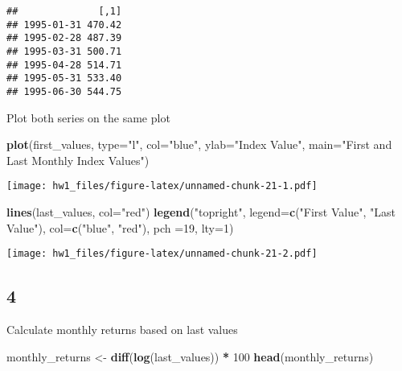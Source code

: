 \documentclass[
]{article}
\newenvironment{Shaded}{\begin{snugshade}}{\end{snugshade}}
\newcommand{\AttributeTok}[1]{\textcolor[rgb]{0.13,0.29,0.53}{#1}}
\newcommand{\DecValTok}[1]{\textcolor[rgb]{0.00,0.00,0.81}{#1}}
\newcommand{\FunctionTok}[1]{\textcolor[rgb]{0.13,0.29,0.53}{\textbf{#1}}}
\newcommand{\NormalTok}[1]{#1}
\newcommand{\OtherTok}[1]{\textcolor[rgb]{0.56,0.35,0.01}{#1}}
\newcommand{\SpecialCharTok}[1]{\textcolor[rgb]{0.81,0.36,0.00}{\textbf{#1}}}
\newcommand{\StringTok}[1]{\textcolor[rgb]{0.31,0.60,0.02}{#1}}
\begin{document}
\begin{verbatim}
##              [,1]
## 1995-01-31 470.42
## 1995-02-28 487.39
## 1995-03-31 500.71
## 1995-04-28 514.71
## 1995-05-31 533.40
## 1995-06-30 544.75
\end{verbatim}

Plot both series on the same plot

\begin{Shaded}
\begin{Highlighting}[]
\FunctionTok{plot}\NormalTok{(first\_values, }\AttributeTok{type=}\StringTok{"l"}\NormalTok{, }\AttributeTok{col=}\StringTok{"blue"}\NormalTok{, }\AttributeTok{ylab=}\StringTok{"Index Value"}\NormalTok{, }\AttributeTok{main=}\StringTok{"First and Last Monthly Index Values"}\NormalTok{)}
\end{Highlighting}
\end{Shaded}

\texttt{[image: hw1\_files/figure-latex/unnamed-chunk-21-1.pdf]}

\begin{Shaded}
\begin{Highlighting}[]
\FunctionTok{lines}\NormalTok{(last\_values, }\AttributeTok{col=}\StringTok{"red"}\NormalTok{)}
\FunctionTok{legend}\NormalTok{(}\StringTok{"topright"}\NormalTok{, }\AttributeTok{legend=}\FunctionTok{c}\NormalTok{(}\StringTok{"First Value"}\NormalTok{, }\StringTok{"Last Value"}\NormalTok{), }\AttributeTok{col=}\FunctionTok{c}\NormalTok{(}\StringTok{"blue"}\NormalTok{, }\StringTok{"red"}\NormalTok{), }\AttributeTok{pch =}\DecValTok{19}\NormalTok{, }\AttributeTok{lty=}\DecValTok{1}\NormalTok{)}
\end{Highlighting}
\end{Shaded}

\texttt{[image: hw1\_files/figure-latex/unnamed-chunk-21-2.pdf]}

\subsection{4}\label{section-3}

Calculate monthly returns based on last values

\begin{Shaded}
\begin{Highlighting}[]
\NormalTok{monthly\_returns }\OtherTok{\textless{}{-}} \FunctionTok{diff}\NormalTok{(}\FunctionTok{log}\NormalTok{(last\_values)) }\SpecialCharTok{*} \DecValTok{100}
\FunctionTok{head}\NormalTok{(monthly\_returns)}
\end{Highlighting}
\end{Shaded}
\end{document}
